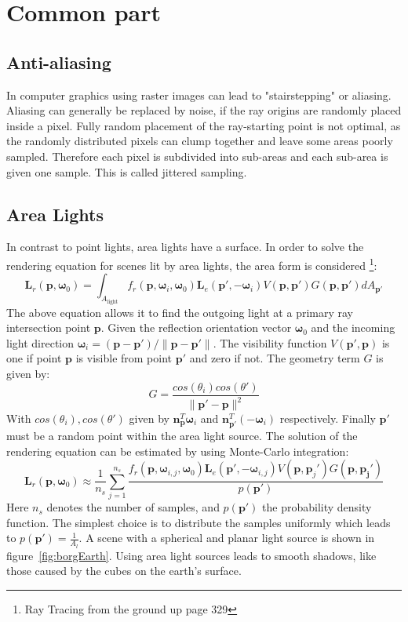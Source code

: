 \section{Common part}
\subsection{Anti-aliasing}
In computer graphics using raster images can lead to "stairstepping" or aliasing. Aliasing can generally be replaced by noise, if the ray origins are randomly placed inside a pixel. Fully random placement of the ray-starting point is not optimal, as the randomly distributed pixels can clump together and leave some areas poorly sampled. Therefore each pixel is subdivided into sub-areas and each sub-area is given one sample. This is called jittered sampling. 

\subsection{Area Lights}
In contrast to point lights, area lights have a surface. In order to solve the rendering equation for scenes lit by area lights, the area form is considered \footnote{Ray Tracing from the ground up page 329}:
\begin{equation}
\mathbf{L}_r(\mathbf{p},\mathbf{\omega}_0) = \int_{A_{\text{light}}} f_r(\mathbf{p},\mathbf{\omega}_i,\mathbf{\omega}_0) \mathbf{L}_e(\mathbf{p}',-\mathbf{\omega}_i)V(\mathbf{p},\mathbf{p}')G(\mathbf{p},\mathbf{p}')dA_{\mathbf{p}'}
\end{equation}
The above equation allows it to find the outgoing light at a primary ray intersection point $\mathbf{p}$. Given the reflection orientation vector $\mathbf{\omega}_0$ and the incoming light direction $\mathbf{\omega}_i = (\mathbf{p} - \mathbf{p}') / \|\mathbf{p} - \mathbf{p}'\|$. The visibility function $V(\mathbf{p}',\mathbf{p})$ is one if point $\mathbf{p}$ is visible from point $\mathbf{p}'$ and zero if not. The geometry term $G$ is given by:
\begin{equation}
G = \frac{cos (\theta_i) cos (\theta')}{\| \mathbf{p}' - \mathbf{p}\| ^ 2}
\end{equation}  
With $cos (\theta_i), cos (\theta')$ given by $\mathbf{n}_\mathbf{p} ^ T \mathbf{\omega}_i$ and $\mathbf{n}^{T}_{\mathbf{p}'} (-\mathbf{\omega}_i)$ respectively. Finally $\mathbf{p}'$ must be a random point within the area light source.
The solution of the rendering equation can be estimated by using Monte-Carlo integration:
\begin{equation}
\mathbf{L}_r(\mathbf{p},\mathbf{\omega}_0) \approx \frac{1}{n_s} \sum_{j=1}^{n_s} \frac{f_r(\mathbf{p},\mathbf{\omega}_{i,j},\mathbf{\omega}_0) \mathbf{L}_e(\mathbf{p}',-\mathbf{\omega}_{i,j})V(\mathbf{p},\mathbf{p}_j')G(\mathbf{p},\mathbf{p_j}')}{p(\mathbf{p}')}
\end{equation}
Here $n_s$ denotes the number of samples, and $p(\mathbf{p}')$ the probability density function. The simplest choice is to distribute the samples uniformly which leads to $p(\mathbf{p}') = \frac{1}{A_l}$. A scene with a spherical and planar light source is shown in figure~\ref{fig:borgEarth}. Using area light sources leads to smooth shadows, like those caused by the cubes on the earth's surface. 


